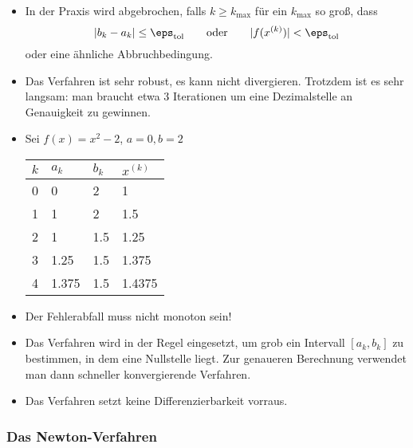 \documentclass[11pt]{scrartcl}
\begin{document}
\begin{nt*}
	\begin{itemize}
		\item
			In der Praxis wird abgebrochen, falls $k \ge k_{\text{max}}$ für ein $k_{\text{max}}$ so groß, dass
			\[
				|b_k -a_k| \le \eps_{\text{tol}}
				\qquad
				\text{oder}
				\qquad
				|f(x^{(k)})| < \eps_{\text{tol}}
			\]
			oder eine ähnliche Abbruchbedingung.
		\item
			Das Verfahren ist sehr robust, es kann nicht divergieren.
			Trotzdem ist es sehr langsam: man braucht etwa 3 Iterationen um eine Dezimalstelle an Genauigkeit zu gewinnen.
		\item
			Sei $f(x) = x^2 - 2$, $a=0, b=2$
			\begin{table}[!ht]
				\centering
				\begin{tabular}{c|l|l|l}
					$k$ & $a_k$ & $b_k$ & $x^{(k)}$ \\ \hline
					0 & 0 & 2 & 1 \\
					1 & 1 & 2 & 1.5 \\
					2 & 1 & 1.5 & 1.25 \\
					3 & 1.25 & 1.5 & 1.375 \\
					4 & 1.375 & 1.5 & 1.4375 
				\end{tabular}
			\end{table}
		\item
			Der Fehlerabfall muss nicht monoton sein!
		\item
			Das Verfahren wird in der Regel eingesetzt, um grob ein Intervall $[a_k,b_k]$ zu bestimmen, in dem eine Nullstelle liegt.
			Zur genaueren Berechnung verwendet man dann schneller konvergierende Verfahren.
		\item
			Das Verfahren setzt keine Differenzierbarkeit vorraus.
	\end{itemize}
\end{nt*}

\subsubsection{Das Newton-Verfahren}
\end{document}
